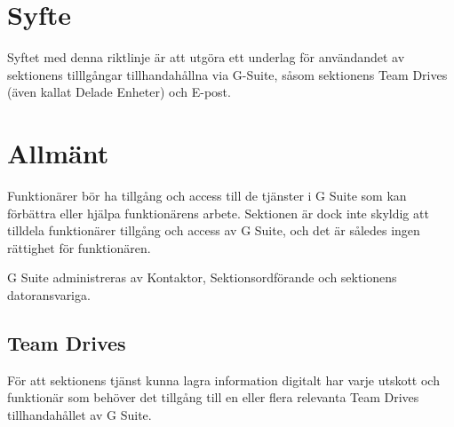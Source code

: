 \documentclass[10pt]{article}
\begin{document}
    \section*{\doctitle}
    \vspace{6px}

    \section{Syfte}
    \vspace{6px}
    
    Syftet med denna riktlinje är att utgöra ett underlag för användandet av sektionens tilllgångar tillhandahållna via G-Suite, såsom sektionens Team Drives (även kallat Delade Enheter) och E-post. 
    
    \vspace{6px}
    \section{Allmänt}
    \vspace{6px}

    Funktionärer bör ha tillgång och access till de tjänster i G Suite som kan förbättra eller hjälpa funktionärens arbete. 
    Sektionen är dock inte skyldig att tilldela funktionärer tillgång och access av G Suite, och det är således ingen rättighet för funktionären. 
 
    G Suite administreras av Kontaktor, Sektionsordförande och sektionens datoransvariga. 
    
    \vspace{3px}
    \subsection{Team Drives}
    \vspace{3px}

    För att sektionens tjänst kunna lagra information digitalt har varje utskott och funktionär som behöver det tillgång till en eller flera relevanta Team Drives tillhandahållet av G Suite. 
\end{document}
